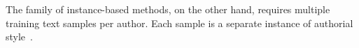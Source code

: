 The family of instance-based methods, on the other hand, requires multiple training text samples per author. 
Each sample is a separate instance of authorial style~\citep{stamatatos_survey_2009,altakrori_topic_2021,elmanarelbouanani_authorship_2014,neal_surveying_2018}.
